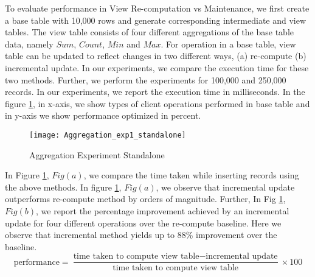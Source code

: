 \documentclass[11pt,a4paper,bibtotoc,idxtotoc,headsepline,footsepline,footexclude,BCOR12mm,DIV13]{scrbook}
\begin{document}
To evaluate performance in View Re-computation vs Maintenance, we first create a base table with 10,000 rows and generate corresponding intermediate and view tables. The view table consists of four different aggregations of the base table data, namely $Sum$, $Count$, $Min$ and $Max$. For operation in a base table, view table can be updated to reflect changes in two different ways, (a) re-compute (b) incremental update. In our experiments, we compare the execution time for these two methods. Further, we perform the experiments for 100,000 and 250,000 records. In our experiments, we report the execution time in milliseconds. In the figure \ref{sec:AggrExpStandalone}, in x-axis, we show types of client operations performed in base table and in y-axis we show performance optimized in percent. 

\begin{figure}
	\centering
	\texttt{[image: Aggregation\_exp1\_standalone]}
	\caption{Aggregation Experiment Standalone}
	\label{sec:AggrExpStandalone}
\end{figure} 
\newpage
In Figure \ref{sec:AggrExpStandalone}, $Fig(a)$, we compare the time taken while inserting records using the above methods. In figure \ref{sec:AggrExpStandalone}, $Fig(a)$, we observe that incremental update outperforms re-compute method by orders of magnitude. Further, In Fig \ref{sec:AggrExpStandalone}, $Fig(b)$, we report the percentage improvement achieved by an incremental update for four different operations over the re-compute baseline. Here we observe that incremental method yields up to 88\% improvement over the baseline.
\newline
\begin{equation}
\text{performance} = \frac{\text{time taken to compute view table} - \text{incremental update}}{\text{time taken to compute view table}} \times 100
\end{equation}
	 
\end{document}
